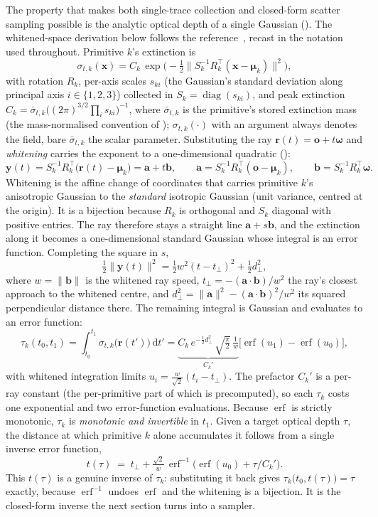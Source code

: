 The property that makes both single-trace collection and closed-form scatter sampling possible is the
analytic optical depth of a single Gaussian (). The whitened-space derivation
below follows the reference~\cite{DSYG}, recast in the notation used throughout. Primitive $k$'s
extinction is
\[
  \sigma_{t,k}(\bm{x}) = C_k\,\exp\!\big(-\tfrac12\lVert S_k^{-1}R_k^{\!\top}(\bm{x}-\bm{\mu}_k)\rVert^2\big),
\]
with rotation $R_k$, per-axis scales $s_{ki}$ (the Gaussian's standard deviation along principal axis
$i\in\{1,2,3\}$) collected in $S_k=\operatorname{diag}(s_{ki})$, and peak extinction $C_k=\bar\sigma_{t,k}\big((2\pi)^{3/2}\prod_i s_{ki}\big)^{-1}$,
where $\bar\sigma_{t,k}$ is the primitive's stored extinction mass (the mass-normalised
convention of ); $\sigma_{t,k}(\cdot)$ with an argument always
denotes the field, bare $\bar\sigma_{t,k}$ the scalar parameter. Substituting the ray
$\bm{r}(t)=\bm{o}+t\bm{\omega}$ and \emph{whitening} carries the exponent to a one-dimensional
quadratic ():
\[
  \bm{y}(t)=S_k^{-1}R_k^{\!\top}\big(\bm{r}(t)-\bm{\mu}_k\big)=\bm{a}+t\bm{b},
  \qquad
  \bm{a}=S_k^{-1}R_k^{\!\top}(\bm{o}-\bm{\mu}_k),
  \qquad
  \bm{b}=S_k^{-1}R_k^{\!\top}\bm{\omega}.
\]
Whitening is the affine change of coordinates that carries primitive
$k$'s anisotropic Gaussian to the \emph{standard} isotropic Gaussian (unit variance, centred at the
origin). It is a bijection because $R_k$ is orthogonal and $S_k$ diagonal with positive entries. The
ray therefore stays a straight line $\bm{a}+s\bm{b}$, and the extinction along it becomes a
one-dimensional standard Gaussian whose integral is an error function. Completing the square in $s$,
\[
  \tfrac12\lVert\bm{y}(t)\rVert^2 = \tfrac12 w^2 (t-t_\perp)^2 + \tfrac12 d_\perp^2,
\]
where $w=\lVert\bm{b}\rVert$ is the whitened ray speed, $t_\perp=-(\bm{a}\cdot\bm{b})/w^2$ the ray's
closest approach to the whitened centre, and $d_\perp^2=\lVert\bm{a}\rVert^2-(\bm{a}\cdot\bm{b})^2/w^2$
its squared perpendicular distance there. The remaining integral is Gaussian and evaluates to an
error function:
\[
  \tau_k(t_0, t_1) = \int_{t_0}^{t_1}\! \sigma_{t,k}\big(\bm{r}(t')\big)\,\mathrm{d}t'
  = \underbrace{C_k\, e^{-\tfrac12 d_\perp^2}\,\sqrt{\tfrac{\pi}{2}}\,\tfrac1w}_{\displaystyle C_k'}
  \big[\operatorname{erf}(u_1) - \operatorname{erf}(u_0)\big],
\]
with whitened integration limits $u_i=\tfrac{w}{\sqrt2}(t_i-t_\perp)$.
The prefactor $C_k'$ is a per-ray constant (the per-primitive part of which is precomputed), so each
$\tau_k$ costs one exponential and two error-function evaluations. Because $\operatorname{erf}$ is
strictly monotonic, $\tau_k$ is \emph{monotonic and invertible} in $t_1$. Given a target optical depth
$\tau$, the distance at which primitive $k$ alone accumulates it follows from a single inverse error
function,
\[
  t(\tau) \;=\; t_\perp + \tfrac{\sqrt2}{w}\,
  \operatorname{erf}^{-1}\!\Big(\operatorname{erf}(u_0) + \tau/C_k'\Big).
\]
This $t(\tau)$ is a genuine inverse of $\tau_k$: substituting it back gives
$\tau_k\big(t_0,t(\tau)\big)=\tau$ exactly, because $\operatorname{erf}^{-1}$ undoes $\operatorname{erf}$
and the whitening is a bijection. It is the closed-form inverse the next section turns into a sampler.

